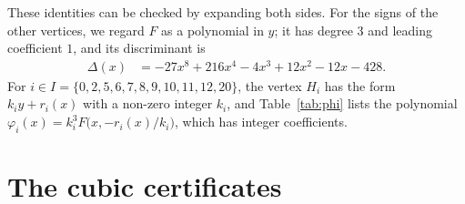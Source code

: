 \documentclass[11pt]{article}
\begin{document}
These identities can be checked by expanding both sides.
For the signs of the other vertices, we regard $F$ as a polynomial in $y$; it has degree $3$ and leading coefficient $1$, and its discriminant is
\begin{align*}
\Delta(x)&=-27x^{8}+216x^{4}-4x^{3}+12x^{2}-12x-428.
\end{align*}
For $i\in I=\{0,\allowbreak 2,\allowbreak 5,\allowbreak 6,\allowbreak 7,\allowbreak 8,\allowbreak 9,\allowbreak 10,\allowbreak 11,\allowbreak 12,\allowbreak 20\}$, the vertex $H_i$ has the form $k_iy+r_i(x)$ with a non-zero integer $k_i$, and Table~\ref{tab:phi} lists the polynomial $\varphi_i(x)=k_i^3F\bigl(x,-r_i(x)/k_i\bigr)$, which has integer coefficients.

\section{The cubic certificates}
\end{document}
